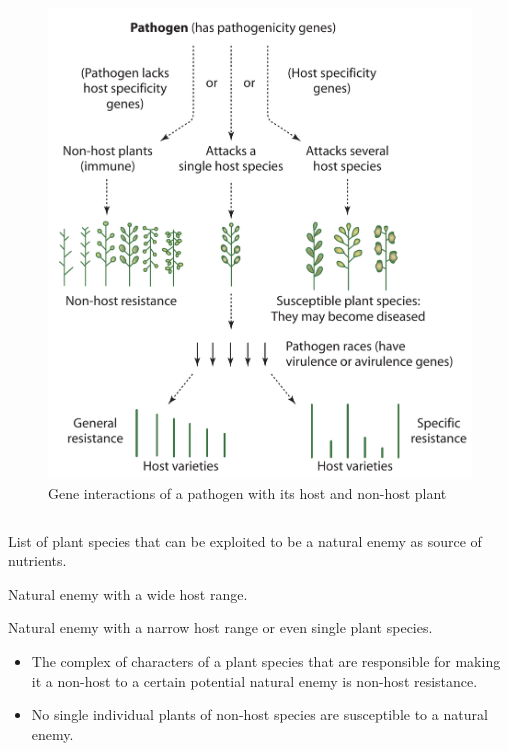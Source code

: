 \documentclass[11pt,dvipsnames,ignorenonframetext,aspectratio=169]{beamer}
\providecommand{\tightlist}{%
  \setlength{\itemsep}{0pt}\setlength{\parskip}{0pt}}
\begin{document}
\begin{frame}{}
\begin{columns}[T, onlytextwidth]
\begin{figure}
\includegraphics[width=0.7\linewidth]{../images/host_non_host} \caption{Gene interactions of a pathogen with its host and non-host plant}\label{fig:pathogen-host-non-host-interaction}
\end{figure}

\end{columns}
\end{frame}

\begin{frame}{}
\protect\hypertarget{section-1}{}
\begin{description}
\small
\item[Host range] List of plant species that can be exploited to be a natural enemy as source of nutrients.
\item[Generalists/polyphagous] Natural enemy with a wide host range.
\item[Specialits/oligophagous/monophagous] Natural enemy with a narrow host range or even single plant species.
\end{description}

\begin{itemize}
\tightlist
\item
  The complex of characters of a plant species that are responsible for
  making it a non-host to a certain potential natural enemy is non-host
  resistance.
\item
  No single individual plants of non-host species are susceptible to a
  natural enemy.
\end{itemize}
\end{frame}
\end{document}
